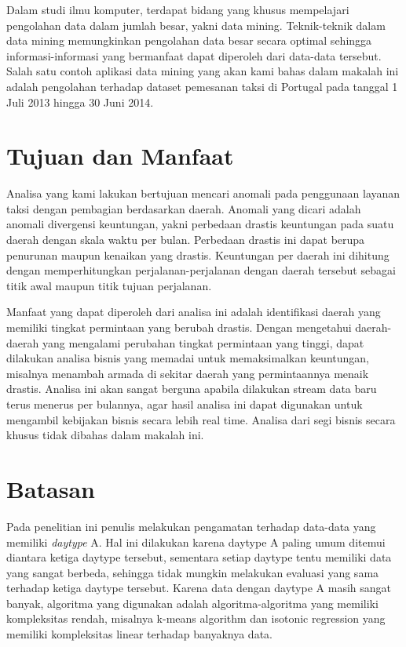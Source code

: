 \documentclass{article}
\begin{document}
Dalam studi ilmu komputer, terdapat bidang yang khusus mempelajari pengolahan data dalam jumlah besar, yakni data mining. Teknik-teknik dalam data mining memungkinkan pengolahan data besar secara optimal sehingga informasi-informasi yang bermanfaat dapat diperoleh dari data-data tersebut. Salah satu contoh aplikasi data mining yang akan kami bahas dalam makalah ini adalah pengolahan terhadap dataset pemesanan taksi di Portugal pada tanggal 1 Juli 2013 hingga 30 Juni 2014.

\section{Tujuan dan Manfaat}

Analisa yang kami lakukan bertujuan mencari anomali pada penggunaan layanan taksi dengan pembagian berdasarkan daerah. Anomali yang dicari adalah anomali divergensi keuntungan, yakni perbedaan drastis keuntungan pada suatu daerah dengan skala waktu per bulan. Perbedaan drastis ini dapat berupa penurunan maupun kenaikan yang drastis. Keuntungan per daerah ini dihitung dengan memperhitungkan perjalanan-perjalanan dengan daerah tersebut sebagai titik awal maupun titik tujuan perjalanan.

Manfaat yang dapat diperoleh dari analisa ini adalah identifikasi daerah yang memiliki tingkat permintaan yang berubah drastis. Dengan mengetahui daerah-daerah yang mengalami perubahan tingkat permintaan yang tinggi, dapat dilakukan analisa bisnis yang memadai untuk memaksimalkan keuntungan, misalnya menambah armada di sekitar daerah yang permintaannya menaik drastis. Analisa ini akan sangat berguna apabila dilakukan stream data baru terus menerus per bulannya, agar hasil analisa ini dapat digunakan untuk mengambil kebijakan bisnis secara lebih real time.  Analisa dari segi bisnis secara khusus tidak dibahas dalam makalah ini.

\section{Batasan}

Pada penelitian ini penulis melakukan pengamatan terhadap data-data yang memiliki \textit{daytype} A. Hal ini dilakukan karena daytype A paling umum ditemui diantara ketiga daytype tersebut, sementara setiap daytype tentu memiliki data yang sangat berbeda, sehingga tidak mungkin melakukan evaluasi yang sama terhadap ketiga daytype tersebut. Karena data dengan daytype A masih sangat banyak, algoritma yang digunakan adalah algoritma-algoritma yang memiliki kompleksitas rendah, misalnya k-means algorithm dan  isotonic regression yang memiliki kompleksitas linear terhadap banyaknya data.
\end{document}
